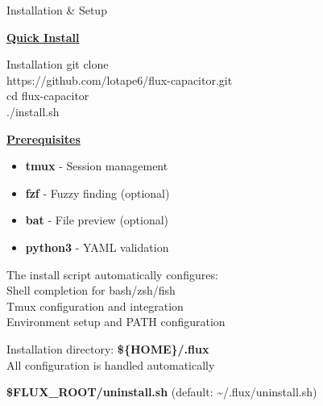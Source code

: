 \documentclass[10pt,a4paper]{article}
\begin{document}
\begin{multicols}{3}
\begin{textbox}{Installation \& Setup}

\underline{\textbf{Quick Install}}

\begin{simplecodebox}{Installation}
git clone \\
\phantom{xx}https://github.com/lotape6/flux-capacitor.git\\
cd flux-capacitor\\
./install.sh\\
\end{simplecodebox}

\underline{\textbf{Prerequisites}}
\begin{itemize}
    \item \textbf{tmux} - Session management
    \item \textbf{fzf} - Fuzzy finding (optional)
    \item \textbf{bat} - File preview (optional)  
    \item \textbf{python3} - YAML validation
\end{itemize}


The install script automatically configures:\\

Shell completion for bash/zsh/fish\\

Tmux configuration and integration\\

Environment setup and PATH configuration\\


Installation directory: \textbf{\$\{HOME\}/.flux}\\

All configuration is handled automatically\\


\textbf{\$FLUX\_ROOT/uninstall.sh} (default: \textasciitilde/.flux/uninstall.sh)

\end{textbox}

\end{multicols}
\end{document}
